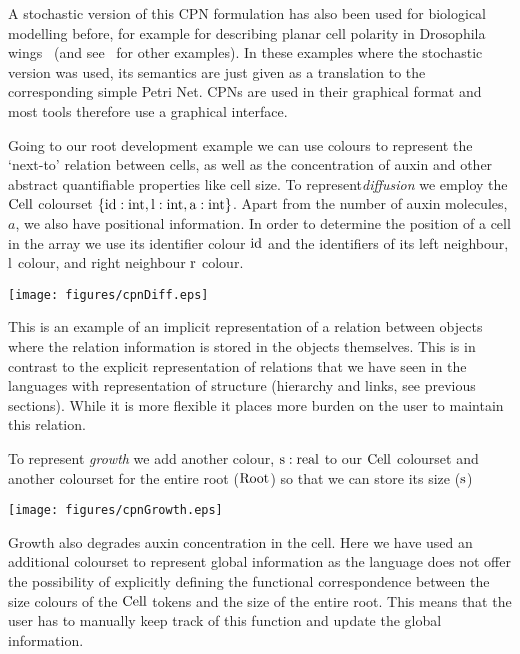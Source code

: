 A stochastic version of this CPN formulation has also been used for biological
modelling before, for example for describing planar cell polarity in Drosophila
wings~\citep{gao_multiscale_2013} (and see~\citet{runge_application_2004,
gilbert_colouring_2013} for other examples). In these examples where the
stochastic version was used, its semantics are just given as a translation to
the corresponding simple Petri Net. CPNs are used in their graphical format and
most tools therefore use a graphical interface.

Going to our root development example we can use colours to represent the
`next-to' relation between cells, as well as the concentration of auxin and
other abstract quantifiable properties like cell size. To represent\emph{diffusion} we
employ the $\mathrm{Cell}$ colourset $\{\mathrm{id}: \mathrm{int}, \mathrm{l}:\mathrm{int},
\mathrm{a}:\mathrm{int} \} $. Apart from the number of auxin molecules, $a$, we also have
positional information. In order to determine the position of a cell in the
array we use its identifier colour $\mathrm{id}$ and the identifiers of its left
neighbour, $\mathrm{l}$ colour, and right neighbour $\mathrm{r}$ colour.
\begin{center}
    \texttt{[image: figures/cpnDiff.eps]}
\end{center}
This is an example of an implicit representation of a relation between objects
where the relation information is stored in the objects themselves. This is in
contrast to the explicit representation of relations that we have seen in the
languages with representation of structure (hierarchy and links, see
previous sections). While it is more flexible it places more burden on the user
to maintain this relation.

To represent \emph{growth} we add another colour,
$\mathrm{s}:\rm{real}$ to our $\mathrm{Cell}$ colourset and another colourset for the
entire root ($\mathrm{Root}$) so that we can store its size ($\rm{s}$)
\begin{center}
    \texttt{[image: figures/cpnGrowth.eps]}
\end{center}
Growth also degrades auxin concentration in the cell. Here we have used an
additional colourset to represent global information as the language does not
offer the possibility of explicitly defining the functional correspondence
between the size colours of the $\mathrm{Cell}$ tokens and the size of the entire
root. This means that the user has to manually keep track of this function and
update the global information.

